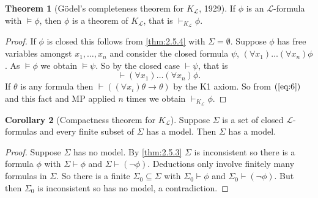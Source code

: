 \documentclass{article}
\renewcommand{\L}{\mathcal{L}}
\newcommand{\rb}[1]{\left( #1 \right)}
\newcommand{\notb}[1]{\rb{\neg #1}}
\newcommand{\impb}[2]{\rb{#1 \rightarrow #2}}
\newcommand{\fab}[1]{\rb{\forall #1}}
\theoremstyle{definition}\newtheorem{definition}{Definition}[subsection]
\theoremstyle{definition}\newtheorem{remark}[definition]{Remark}
\theoremstyle{definition}\newtheorem*{example}{Example}
\theoremstyle{definition}\newtheorem*{note}{Note}
\newtheorem{theorem}[definition]{Theorem}
\newtheorem{corollary}[definition]{Corollary}
\begin{document}
\begin{theorem}[Gödel's completeness theorem for $ K_{\L} $, 1929]
If $ \phi $ is an $ \L $-formula with $ \vDash \phi $, then $ \phi $ is a theorem of $ K_{\L} $, that is $ \vdash_{K_{\L}} \phi $.
\end{theorem}

\begin{proof}
If $ \phi $ is closed this follows from \ref{thm:2.5.4} with $ \Sigma = \emptyset $. Suppose $ \phi $ has free variables amongst $ x_1, \dots, x_n $ and consider the closed formula $ \psi $, $ \fab{x_1} \dots \fab{x_n}\phi $. As $ \vDash \phi $ we obtain $ \vDash \psi $. So by the closed case $ \vdash \psi $, that is
\begin{equation}
\label{eq:6}
\vdash \fab{x_1} \dots \fab{x_n}\phi.
\end{equation}
If $ \theta $ is any formula then $ \vdash \impb{\fab{x_i}\theta}{\theta} $ by the K1 axiom. So from $ \rb{\ref{eq:6}} $ and this fact and MP applied $ n $ times we obtain $ \vdash_{K_{\L}} \phi $.
\end{proof}

\begin{corollary}[Compactness theorem for $ K_{\L} $]
\label{cor:2.5.6}
Suppose $ \Sigma $ is a set of closed $ \L $-formulas and every finite subset of $ \Sigma $ has a model. Then $ \Sigma $ has a model.
\end{corollary}

\begin{proof}
Suppose $ \Sigma $ has no model. By \ref{thm:2.5.3} $ \Sigma $ is inconsistent so there is a formula $ \phi $ with $ \Sigma \vdash \phi $ and $ \Sigma \vdash \notb{\phi} $. Deductions only involve finitely many formulas in $ \Sigma $. So there is a finite $ \Sigma_0 \subseteq \Sigma $ with $ \Sigma_0 \vdash \phi $ and $ \Sigma_0 \vdash \notb{\phi} $. But then $ \Sigma_0 $ is inconsistent so has no model, a contradiction.
\end{proof}

\end{document}

